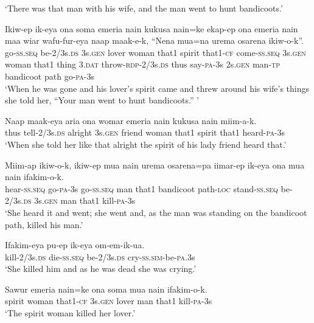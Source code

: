 \glt ‘There was that man with his wife, and the man went to hunt bandicoots.’ \\
\z


\ea
\gll  Ikiw-ep  ik-eya  ona  soma  emeria  nain  kukusa  nain=ke        ekap-ep  ona  emeria  nain  maa  wiar  wafu-fur-eya                 naap  maak-e-k,  “Nena  mua=na  urema  osarena  ikiw-o-k”. \\
go-\textsc{ss.seq}  be-2/3s.\textsc{ds}  3s.\textsc{gen}  lover  woman  that1  spirit  that1-\textsc{cf}   come-\textsc{ss.seq}  3s.\textsc{gen}  woman  that1  thing  3.\textsc{dat}  throw-\textsc{rdp}-2/3s.\textsc{ds}  thus  say-\textsc{pa}-3s  2s.\textsc{gen}  man-\textsc{tp}  bandicoot  path  go-\textsc{pa}-3s \\




\glt ‘When he was gone and his lover’s spirit came and threw around his wife’s things she told her, “Your man went to hunt bandicoots.” ’ \\
\z


\ea
\gll  Naap  maak-eya  aria  ona  womar  emeria  nain  kukusa  nain  miim-a-k. \\
thus  tell-2/3s.\textsc{ds}  alright  3s.\textsc{gen}  friend  woman  that1  spirit  that1  heard-\textsc{pa}-3s \\
\glt ‘When she told her like that alright the spirit of his lady friend heard that.’ \\
\z


\ea
\gll  Miim-ap  ikiw-o-k,  ikiw-ep  mua  nain  urema  osarena=pa    iimar-ep  ik-eya  ona  mua  nain  ifakim-o-k. \\
hear-\textsc{ss.seq}  go-\textsc{pa}-3s  go-\textsc{ss.seq}  man  that1  bandicoot  path-\textsc{loc}  stand-\textsc{ss.seq}  be-2/3s.\textsc{ds}  3s.\textsc{gen}  man  that1  kill-\textsc{pa}-3s \\


\glt ‘She heard it and went; she went and, as the man was standing on the bandicoot path, killed his man.’ \\
\z


\ea
\gll  Ifakim-eya  pu-ep  ik-eya  om-em-ik-ua. \\
kill-2/3s.\textsc{ds}  die-\textsc{ss.seq}  be-2/3s.\textsc{ds}  cry-\textsc{ss}.\textsc{sim}-be-\textsc{pa}.3s \\
\glt ‘She killed him and as he was dead she was crying.’ \\
\z


\ea
\gll  Sawur  emeria  nain=ke  ona  soma  mua  nain  ifakim-o-k. \\
spirit  woman  that1-\textsc{cf}  3s.\textsc{gen}  lover  man  that1  kill-\textsc{pa}-3s \\
\glt ‘The spirit woman killed her lover.’ \\
\z


